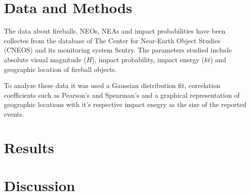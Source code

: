 \documentclass[
	a4paper, %
	10pt, %
	unnumberedsections, %
	twoside, %
]{LTJournalArticle}
\begin{document}

\section{Data and Methods}

The data about fireballs, NEOs, NEAs and impact probabilities have been collectes from the database of
The Center for Near-Earth Object Studies (CNEOS) and its monitoring system Sentry. The parameters
studied include absolute visual magnitude ($H$), impact probability, impact energy ($kt$) and
geographic location of fireball objects.

To analyze these data it was used a Gaussian distribution fit, correlation coefficients such as
Pearson's and Spearman's and a graphical representation of geographic locations with it's respective
impact enegry as the size of the reported events.


\section{Results}



\section{Discussion}



\printbibliography %

\end{document}

